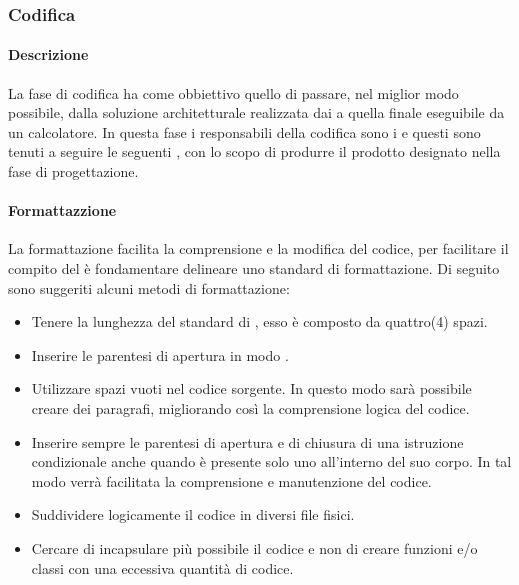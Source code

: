 \subsubsection{Codifica}
\paragraph{Descrizione}
La fase di codifica ha come obbiettivo quello di passare, nel miglior modo possibile, dalla soluzione architetturale realizzata dai \textit{\ProgP} a quella finale eseguibile da un calcolatore.
In questa fase i responsabili della codifica sono i \textit{\ProgrP} e questi sono tenuti a seguire le seguenti , con lo scopo di produrre il prodotto designato nella fase di progettazione.

\paragraph{Formattazzione}
La formattazione facilita la comprensione e la modifica del codice, per facilitare il compito del \textit{\Prog} è fondamentare delineare uno standard di formattazione.
Di seguito sono suggeriti alcuni metodi di formattazione:

\begin{itemize}
\item Tenere la lunghezza del  standard di , esso è composto da quattro(4) spazi.

\item Inserire le parentesi di apertura in modo .

\item Utilizzare spazi vuoti nel codice sorgente. 
In questo modo sarà possibile creare dei paragrafi, migliorando così la comprensione logica del codice.

\item Inserire sempre le parentesi di apertura e di chiusura di una istruzione condizionale anche quando è presente solo uno  all'interno del suo corpo. In tal modo verrà facilitata la comprensione e manutenzione del codice.

\item Suddividere logicamente il codice in diversi file fisici.

\item Cercare di incapsulare più possibile il codice e non di creare funzioni e/o classi con una eccessiva quantità di codice.
\end{itemize}

